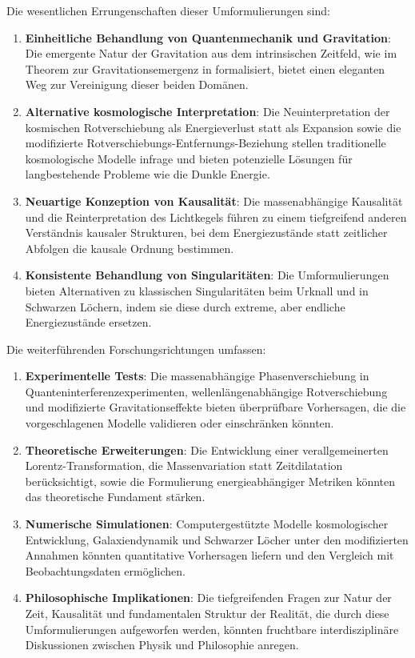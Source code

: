 \documentclass[a4paper,12pt]{article}
\begin{document}
	Die wesentlichen Errungenschaften dieser Umformulierungen sind:
	\begin{enumerate}
		\item \textbf{Einheitliche Behandlung von Quantenmechanik und Gravitation}: Die emergente Natur der Gravitation aus dem intrinsischen Zeitfeld, wie im Theorem zur Gravitationsemergenz in \cite{wesentlicheFormalismen}\relax formalisiert, bietet einen eleganten Weg zur Vereinigung dieser beiden Domänen.
		\item \textbf{Alternative kosmologische Interpretation}: Die Neuinterpretation der kosmischen Rotverschiebung als Energieverlust statt als Expansion sowie die modifizierte Rotverschiebungs-Entfernungs-Beziehung stellen traditionelle kosmologische Modelle infrage und bieten potenzielle Lösungen für langbestehende Probleme wie die Dunkle Energie.
		\item \textbf{Neuartige Konzeption von Kausalität}: Die massenabhängige Kausalität und die Reinterpretation des Lichtkegels führen zu einem tiefgreifend anderen Verständnis kausaler Strukturen, bei dem Energiezustände statt zeitlicher Abfolgen die kausale Ordnung bestimmen.
		\item \textbf{Konsistente Behandlung von Singularitäten}: Die Umformulierungen bieten Alternativen zu klassischen Singularitäten beim Urknall und in Schwarzen Löchern, indem sie diese durch extreme, aber endliche Energiezustände ersetzen.
	\end{enumerate}
	
	Die weiterführenden Forschungsrichtungen umfassen:
	\begin{enumerate}
		\item \textbf{Experimentelle Tests}: Die massenabhängige Phasenverschiebung in Quanteninterferenzexperimenten, wellenlängenabhängige Rotverschiebung und modifizierte Gravitationseffekte bieten überprüfbare Vorhersagen, die die vorgeschlagenen Modelle validieren oder einschränken könnten.
		\item \textbf{Theoretische Erweiterungen}: Die Entwicklung einer verallgemeinerten Lorentz-Transformation, die Massenvariation statt Zeitdilatation berücksichtigt, sowie die Formulierung energieabhängiger Metriken könnten das theoretische Fundament stärken.
		\item \textbf{Numerische Simulationen}: Computergestützte Modelle kosmologischer Entwicklung, Galaxiendynamik und Schwarzer Löcher unter den modifizierten Annahmen könnten quantitative Vorhersagen liefern und den Vergleich mit Beobachtungsdaten ermöglichen.
		\item \textbf{Philosophische Implikationen}: Die tiefgreifenden Fragen zur Natur der Zeit, Kausalität und fundamentalen Struktur der Realität, die durch diese Umformulierungen aufgeworfen werden, könnten fruchtbare interdisziplinäre Diskussionen zwischen Physik und Philosophie anregen.
	\end{enumerate}
	
\end{document}
